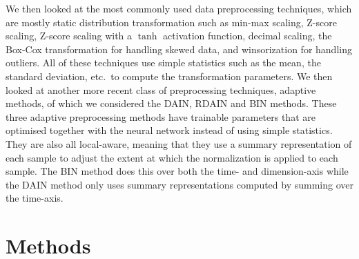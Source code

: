 \documentclass{statsmsc}
\begin{document}
{%
We then looked at the most commonly used data preprocessing techniques, which are mostly static
distribution transformation such as min-max scaling, Z-score scaling, Z-score scaling with a
$\tanh$ activation function, decimal scaling, the Box-Cox transformation for handling skewed data,
and winsorization for handling outliers. All of these techniques use simple statistics such as the
mean, the standard deviation, etc.\ to compute the transformation parameters. We then looked at
another more recent class of preprocessing techniques, adaptive methods, of which we considered the
\ac{DAIN}, \ac{RDAIN} and \ac{BIN} methods. These three adaptive preprocessing
methods have trainable parameters that are optimised together with the neural
network instead of using simple statistics. They are also all local-aware, meaning that they use
a summary representation of each sample to adjust the extent at which the normalization is applied
to each sample. The \ac{BIN} method does this over both the time- and dimension-axis while the
\ac{DAIN} method only uses summary representations computed by summing over the time-axis.


\chapter{Methods} %
\label{ch:Methods}

}
\end{document}
